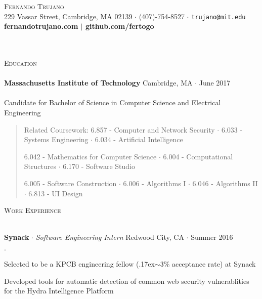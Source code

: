 \documentclass{article}
\newcommand{\area}[1]{\vspace*{-5pt} \begin{verse} #1 \end{verse} }
\newcommand{\lineunder}{\vspace*{-8pt} \\ \hspace*{-18pt} \hrulefill \\}
\newcommand{\header}[1]{{\hspace*{-10pt}\vspace*{9pt} {\large \textsc{#1}}} \vspace*{-5pt} \lineunder \vspace*{5pt}}
\newcommand{\employer}[4]{{ \textbf{#1} $\cdot$ \emph{#3} \hfill #4 $\cdot$ #2 }}
\newcommand{\contact}[3]{
\vspace*{-8pt}
\begin{center}
{\LARGE \scshape {#1}}\\
#2 $\cdot$ #3
\end{center}
\vspace*{-8pt}
}
\newenvironment{achievements}{\begin{list}{$\cdot$}{\topsep 0pt \itemsep -2pt}}{\vspace*{4pt}\end{list}}
\newcommand{\schoolwithcourses}[5]{\textbf{#1} \hfill #2 $\cdot$ #3\\#4\\#5\\\vspace*{3pt}}
\begin{document}
\small

\contact{Fernando Trujano}
{229 Vassar Street, Cambridge, MA 02139}
{(407)-754-8527 $\cdot$ \texttt{trujano@mit.edu}
\\{\bf\large{fernandotrujano.com $|$ github.com/fertogo}}}

  \\
  \\

\header{Education}
\schoolwithcourses{Massachusetts Institute of Technology}{Cambridge, MA}{June 2017 }{}{Candidate for Bachelor of Science in Computer Science and Electrical Engineering}%
\area{
    Related Coursework:    6.857 - Computer and Network Security $\cdot$ 6.033 - Systems Engineering $\cdot$ 6.034 - Artificial Intelligence

    \hspace{85pt}
    6.042 - Mathematics for Computer Science $\cdot$ 6.004 - Computational Structures $\cdot$ 6.170 - Software Studio

    \hspace{85pt}
    6.005 - Software Construction $\cdot$ 6.006 - Algorithms I $\cdot$ 6.046 - Algorithms II  $\cdot$ 6.813 - UI Design

}



\vspace{5pt} \header{Work Experience}

 \employer{Synack}{Summer 2016}{Software Engineering Intern}{Redwood City, CA}
    \begin{achievements}
                \item{Selected to be a KPCB engineering fellow ({\raise.17ex\hbox{$\scriptstyle\mathtt{\sim}$}}3\% acceptance rate) at Synack}
                \item{Developed tools for automatic detection of common web security vulnerablities for the Hydra Intelligence Platform}

    \end{achievements}
\end{document}
